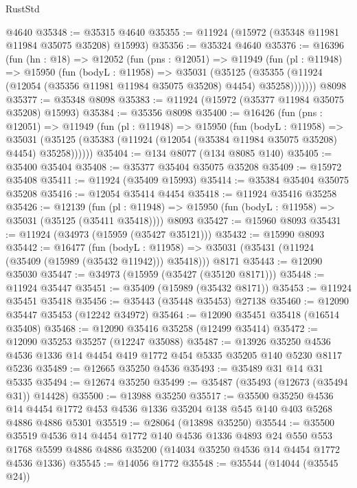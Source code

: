 \begin{lexlean}{RustStd}
\begin{coremodule}
{\begin{coremodule}
{{{{{{{{{{{{{{{{{{{{{{{{{{{{{{{{{{{{{{{{{{{{{{{{{{{{{{{{{{{{{{{{{{{{{{{{{{{{{{{{    @4640
@35348 := @35315 @4640
@35355 := @11924 (@15972 (@35348 @11981 @11984 @35075 @35208) @15993)
@35356 := @35324 @4640
@35376 := @16396
    (fun (hn : @18) =>
    @12052
      (fun (pns : @12051) =>
      @11949
        (fun (pl : @11948) =>
        @15950
          (fun (bodyL : @11958) =>
          @35031
            (@35125
              (@35355 (@11924 (@12054 (@35356 @11981 @11984 @35075 @35208) @4454) @35258)))))))
    @8098
@35377 := @35348 @8098
@35383 := @11924 (@15972 (@35377 @11984 @35075 @35208) @15993)
@35384 := @35356 @8098
@35400 := @16426
    (fun (pns : @12051) =>
    @11949
      (fun (pl : @11948) =>
      @15950
        (fun (bodyL : @11958) =>
        @35031 (@35125 (@35383 (@11924 (@12054 (@35384 @11984 @35075 @35208) @4454) @35258))))))
@35404 := @134 @8077 (@134 @8085 @140)
@35405 := @35400 @35404
@35408 := @35377 @35404 @35075 @35208
@35409 := @15972 @35408
@35411 := @11924 (@35409 @15993)
@35414 := @35384 @35404 @35075 @35208
@35416 := @12054 @35414 @4454
@35418 := @11924 @35416 @35258
@35426 := @12139
    (fun (pl : @11948) => @15950 (fun (bodyL : @11958) => @35031 (@35125 (@35411 @35418))))
    @8093
@35427 := @15960 @8093
@35431 := @11924 (@34973 (@15959 (@35427 @35121)))
@35432 := @15990 @8093
@35442 := @16477
    (fun (bodyL : @11958) => @35031 (@35431 (@11924 (@35409 (@15989 (@35432 @11942))) @35418)))
    @8171
@35443 := @12090 @35030
@35447 := @34973 (@15959 (@35427 (@35120 @8171)))
@35448 := @11924 @35447
@35451 := @35409 (@15989 (@35432 @8171))
@35453 := @11924 @35451 @35418
@35456 := @35443 (@35448 @35453) @27138
@35460 := @12090 @35447 @35453 (@12242 @34972)
@35464 := @12090 @35451 @35418 (@16514 @35408)
@35468 := @12090 @35416 @35258 (@12499 @35414)
@35472 := @12090 @35253 @35257 (@12247 @35088)
@35487 := @13926
    @35250
    @4536
    @4536
    @1336
    @14
    @4454
    @419
    @1772
    @454
    @5335
    @35205
    @140
    @5230
    @8117
    @5236
@35489 := @12665 @35250 @4536
@35493 := @35489 @31 @14 @31 @5335
@35494 := @12674 @35250
@35499 := @35487 (@35493 (@12673 (@35494 @31)) @14428)
@35500 := @13988 @35250
@35517 := @35500
    @35250
    @4536
    @14
    @4454
    @1772
    @453
    @4536
    @1336
    @35204
    @138
    @545
    @140
    @403
    @5268
    @4886
    @4886
    @5301
@35519 := @28064 (@13898 @35250)
@35544 := @35500
    @35519
    @4536
    @14
    @4454
    @1772
    @140
    @4536
    @1336
    @4893
    @24
    @550
    @553
    @1768
    @5599
    @4886
    @4886
    @35200
    (@14034 @35250 @4536 @14 @4454 @1772 @4536 @1336)
@35545 := @14056 @1772
@35548 := @35544 (@14044 (@35545 @24))
}}}}}}}}}}}}}}}}}}}}}}}}}}}}}}}}}}}}}}}}}}}}}}}}}}}}}}}}}}}}}}}}}}}}}}}}}}}}}}}}
\end{coremodule}}
\end{coremodule}
\end{lexlean}
